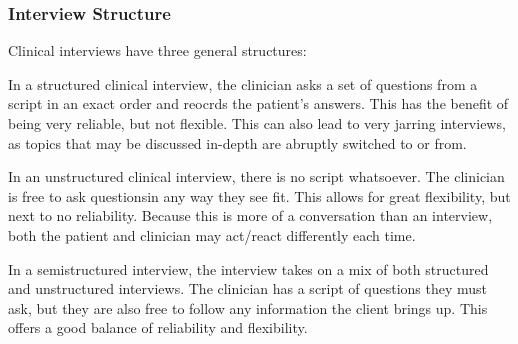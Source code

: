 \subsubsection{Interview Structure}\label{subsubsec:Interview_Structure}
Clinical interviews have three general structures:
\begin{description}[noitemsep]
\item[Structured] In a structured clinical interview, the clinician asks a set of questions from a script in an exact order and reocrds the patient's answers.
  This has the benefit of being very reliable, but not flexible.
  This can also lead to very jarring interviews, as topics that may be discussed in-depth are abruptly switched to or from.
\item[Unstructured] In an unstructured clinical interview, there is no script whatsoever.
  The clinician is free to ask questionsin any way they see fit.
  This allows for great flexibility, but next to no reliability.
  Because this is more of a conversation than an interview, both the patient and clinician may act/react differently each time.
\item[Semistructured] In a semistructured interview, the interview takes on a mix of both structured and unstructured interviews.
  The clinician has a script of questions they must ask, but they are also free to follow any information the client brings up.
  This offers a good balance of reliability and flexibility.
\end{description}


